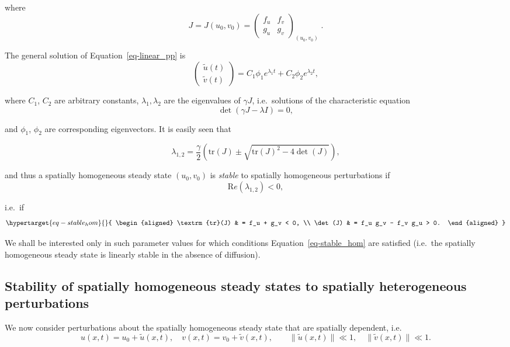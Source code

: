 \documentclass[
  letterpaper,
  DIV=11,
  numbers=noendperiod]{scrreprt}
\theoremstyle{plain}
\theoremstyle{definition}
\theoremstyle{plain}
\theoremstyle{remark}
\begin{document}
where \[
J =J(u_0, v_0) =  \begin{pmatrix} 
f_u & f_v  \\
g_u & g_v 
\end{pmatrix}_{(u_0 , v_0)} \; .  
\]

The general solution of Equation~\ref{eq-linear_pp} is\\
\[
 \begin{pmatrix} 
\tilde u(t) \\
\tilde v(t)
\end{pmatrix}   =  C_1 \phi_1 e^{\lambda_1 t} +  C_2 \phi_2 e^{\lambda_2 t}, 
\]

where \(C_1\), \(C_2\) are arbitrary constants, \(\lambda_1, \lambda_2\)
are the eigenvalues of \(\gamma J\), i.e.~solutions of the
characteristic equation \[
\det (\gamma J - \lambda I) = 0,
\]

and \(\phi_1\), \(\phi_2\) are corresponding eigenvectors. It is easily
seen that

\[
\lambda_{1,2} = \frac \gamma 2 \left( \textrm{tr} (J) \pm \sqrt{ \textrm{tr}(J)^2 - 4 \det(J)} \right),
\]

and thus a spatially homogeneous steady state \((u_0, v_0)\) is
\emph{stable} to spatially homogeneous perturbations if \[
{\mathrm Re}( \lambda_{1,2}) <0,
\]

i.e.~if \begin{equation}\protect\hypertarget{eq-stable_hom}{}{
\begin{aligned}
\textrm{tr}(J) & = f_u + g_v < 0, \\
\det(J) & = f_u g_v - f_v g_u > 0. 
\end{aligned}
}\label{eq-stable_hom}\end{equation}

We shall be interested only in such parameter values for which
conditions Equation~\ref{eq-stable_hom} are satisfied (i.e.~the
spatially homogeneous steady state is linearly stable in the absence of
diffusion).

\hypertarget{stability-of-spatially-homogeneous-steady-states-to-spatially-heterogeneous-perturbations}{%
\subsection{Stability of spatially homogeneous steady states to
spatially heterogeneous
perturbations}\label{stability-of-spatially-homogeneous-steady-states-to-spatially-heterogeneous-perturbations}}

We now consider perturbations about the spatially homogeneous steady
state that are spatially dependent, i.e.~\[
u(x,t) = u_0 + \tilde u(x,t), \quad  v(x,t) = v_0 + \tilde v(x,t), \qquad \|\tilde u(x,t) \| \ll 1, \quad  \|\tilde v(x,t) \| \ll 1.
\]
\end{document}
